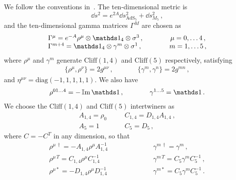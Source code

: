 \documentclass[debug]{phd}
\begin{document}
We follow the conventions in~\cite{Grana_Ntokos}. The ten-dimensional metric is
\begin{equation}
	\dd  s^2 = e^{2A}\dd  s^2_{\mathrm{AdS}_5} + \dd  s^2_{M_5} \, , 
\end{equation}
and the ten-dimensional gamma matrices $\Gamma^M$ are chosen as 
\begin{equation}
	\begin{array}{lcc}
		\Gamma^{\mu} = e^{-A} \rho^{\mu} \otimes \id_4 \otimes \sigma^3\, ,& \phantom{\mbox{with}} & \mu=0, \ldots 4\, , \\
		\Gamma^{m+ 4} = \id_4 \otimes \gamma^m \otimes \sigma^1\, , & \phantom{\mbox{with}} & m=1, \ldots 5 \, ,
	\end{array}
\end{equation}
where $\rho^\mu$ and $\gamma^m$ generate $\mathrm{Cliff}(1,4)$ and $\mathrm{Cliff}(5)$ respectively, satisfying 
\begin{equation}
	\begin{array}{ccc}
		\{\rho^{\mu},\rho^{\nu}\}= 2 g^{\mu\nu}\, , & \phantom{\mbox{with}}& \{\gamma^{m},\gamma^{n}\}= 2 g^{mn} \, , 
	\end{array}
\end{equation}
and $\eta^{\mu \nu} = \mathrm{diag}(-1, 1,1,1,1)$. We also have 
\begin{equation}
	\begin{array}{ccc}
		\rho^{01 \ldots 4}=-\IIm \id\, , & \phantom{\mbox{with}}& \gamma^{1 \ldots 5}=\id\, .
	\end{array}
\end{equation}
We choose the $\mathrm{Cliff}(1,4)$ and $\mathrm{Cliff}(5)$ intertwiners as
\begin{equation}
\label{Achoice}
	\begin{array}{lcl}
		A_{1,4} = \rho_0 & \quad & C_{1,4} = D_{1,4} A_{1,4}\, , \\
		A_5 = 1 & \quad & C_5 = D_5 \, ,
	\end{array}
\end{equation}
where $C = - C^T$ in any dimension, so that 
\begin{equation}
\label{IIbintertw}
	\begin{array}{lcl}
		\rho^{\mu \, \dagger} = - A_{1,4}\rho^{\mu} A_{1,4}^{-1} & \quad \qquad \qquad & \gamma^{m \, \dagger} = \gamma^m\, , \\ 
		\rho^{\mu \, T}= C_{1,4}\rho^{\mu}C_{1,4}^{-1} & \quad \qquad \qquad & \gamma^{m \, T}= C_5 \gamma^m C_5^{-1}\, , \\ 
		\rho^{\mu *}= - D_{1,4} \rho^{\mu} D_{1,4}^{-1} & \quad \qquad \qquad & \gamma^{m *} = C_5 \gamma^m C_5^{-1} \, .
	\end{array}
\end{equation}
\end{document}

